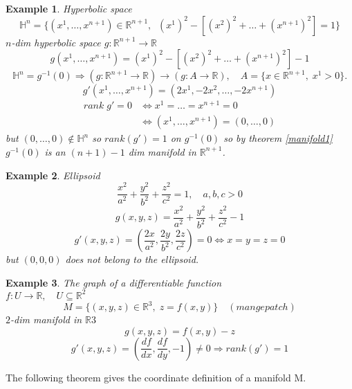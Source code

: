 \documentclass[11pt]{article}
\def\RR{\mathbb{R}}
\newtheorem{example}{Example}[section]
\begin{document}
\begin{example}Hyperbolic space
\[\mathbb{H}^n = \{(x^1,\dots,x^{n+1}) \in \RR^{n+1},  \; \; ( x^1)^2  - [( x^2)^2 + \dots +(x^{n+1})^2 ] = 1\} \]
$n$-dim hyperbolic space $g:\RR^{n+1} \rightarrow \RR$
\[g(x^1,\dots,x^{n+1}) = ( x^1)^2  - [( x^2)^2 + \dots +(x^{n+1})^2 ] - 1 \]
\[\mathbb{H}^n = g^{-1}(0) \Rightarrow (g:\RR^{n+1} \rightarrow \RR) \rightarrow (g: A \rightarrow \RR), \quad A = \{x \in \RR^{n+1}, \; x^1 > 0 \}. \]
\[g'(x^1,\dots,x^{n+1})  = (2x^1, - 2x^2 , \dots, - 2x^{n+1}) \]
\begin{align*}
rank\;g' = 0 &\Leftrightarrow x^1=\dots =x^{n+1}=0\\
&\Leftrightarrow (x^1,\dots ,x^{n+1})=(0,\dots ,0)
\end{align*}
but $(0,\dots ,0) \notin \mathbb{H}^n$ so $rank (g')= 1$ on $g^{-1}(0)$ so by theorem \ref{manifold1} $g^{-1}(0)$ is an $(n+1)-1$ dim manifold in $\RR^{n+1}$.
\end{example}

\begin{example}
Ellipsoid
\[\frac{x^2}{a^2} +\frac{y^2}{b^2} +\frac{z^2}{c^2} =1, \quad a,b,c>0\]
\[g(x,y,z) = \frac{x^2}{a^2} +\frac{y^2}{b^2} +\frac{z^2}{c^2} -1 \]
\[g'(x,y,z) = (\frac{2x}{a^2}, \frac{2y}{b^2} , \frac{2z}{c^2}) = 0 \Leftrightarrow x=y=z=0 \]
but $(0,0,0)$ does not belong to the ellipsoid.
\end{example}

\begin{example}The graph of a differentiable function\\
$f:U \rightarrow \RR, \quad U \subseteq \RR^2$ 
\[M = \{(x,y,z) \in \RR^3, \; z=f(x,y)\}\quad (mange patch) \]
$2$-dim manifold in $\RR3$
\[g(x,y,z)=f(x,y) - z\]
\[g'(x,y,z) = (\frac{df}{dx},\frac{df}{dy},-1) \neq 0 \Rightarrow rank(g') = 1\]
\end{example}


The following theorem gives the coordinate definition of a manifold M.
\end{document}
